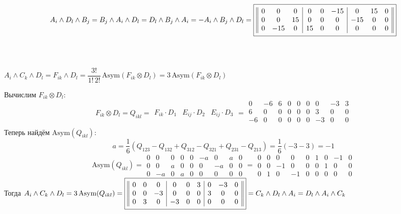 \documentclass{article}
\newcommand*\squared[1]{\tikz[baseline=(char.base)]{
            \node[shape=rectangle,draw,inner sep=4pt] (char) {#1};}}
\begin{document}
$$A_i \wedge D_l \wedge B_j = B_j \wedge A_i \wedge D_l = D_l \wedge B_j \wedge A_i = - A_i \wedge B_j \wedge D_l = \squared{$\begin{array}{||ccc|ccc|ccc||}
0 & 0 & 0 & 0 & 0 & -15 & 0 & 15 & 0 \\
0 & 0 & 15 & 0 & 0 & 0 & -15 & 0 & 0 \\
0 & -15 & 0 & 15 & 0 & 0 & 0 & 0 & 0
\end{array}$}$$
\, \\ \, \\
\begin{center}
$A_i \wedge C_k \wedge D_l = F_{ik} \wedge D_l = \dfrac{3!}{1!\,2!}\,\text{Asym}(F_{ik}\otimes D_l) = 3\,\text{Asym}(F_{ik}\otimes D_l)$
\end{center}
Вычислим $F_{ik}\otimes D_l$:
$$F_{ik}\otimes D_l = Q_{ikl} = \begin{array}{||c|c|c||}
F_{ik}\cdot D_1 & E_{ij}\cdot D_2 & E_{ij}\cdot D_3
\end{array} = \begin{array}{||ccc|ccc|ccc||}
0 & -6 & 6 & 0 & 0 & 0 & 0 & -3 & 3 \\
6 & 0 & 0 & 0 & 0 & 0 & 3 & 0 & 0 \\
-6 & 0 & 0 & 0 & 0 & 0 & -3 & 0 & 0 \\
\end{array}$$
Теперь найдём $\text{Asym}(Q_{ikl})$:
$$a = \frac{1}{6}(Q_{123} - Q_{132} + Q_{312} - Q_{321} + Q_{231} - Q_{213}) = \frac{1}{6}(-3 - 3) = -1$$
$$\text{Asym}(Q_{ikl}) = \begin{array}{||ccc|ccc|ccc||}
0 & 0 & 0 & 0 & 0 & -a & 0 & a & 0 \\
0 & 0 & a & 0 & 0 & 0 & -a & 0 & 0 \\
0 & -a & 0 & a & 0 & 0 & 0 & 0 & 0
\end{array} =  \begin{array}{||ccc|ccc|ccc||}
0 & 0 & 0 & 0 & 0 & 1 & 0 & -1 & 0 \\
0 & 0 & -1 & 0 & 0 & 0 & 1 & 0 & 0 \\
0 & 1 & 0 & -1 & 0 & 0 & 0 & 0 & 0
\end{array}$$
Тогда $A_i \wedge C_k \wedge D_l = 3\,\text{Asym}(Q_{ikl}) = \squared{$\begin{array}{||ccc|ccc|ccc||}
0 & 0 & 0 & 0 & 0 & 3 & 0 & -3 & 0 \\
0 & 0 & -3 & 0 & 0 & 0 & 3 & 0 & 0 \\
0 & 3 & 0 & -3 & 0 & 0 & 0 & 0 & 0
\end{array}$} =  C_k \wedge D_l \wedge A_i = D_l \wedge A_i \wedge C_k$
\end{document}
